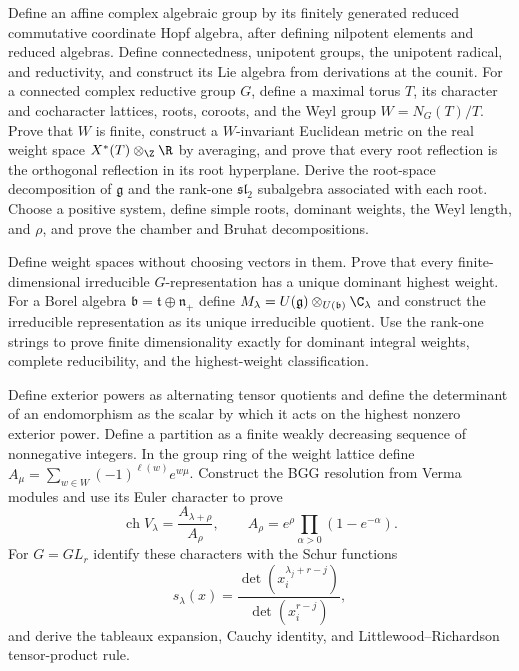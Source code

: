 \begin{exercise}
Define an affine complex algebraic group by its finitely generated reduced
commutative coordinate Hopf algebra, after defining nilpotent elements and
reduced algebras.  Define connectedness, unipotent groups,
the unipotent radical, and reductivity, and construct its Lie algebra from
derivations at the counit.  For a connected complex reductive group $G$,
define a maximal torus $T$, its
character and cocharacter lattices, roots, coroots, and the Weyl group
$W=N_G(T)/T$.  Prove that $W$ is finite, construct a $W$-invariant Euclidean
metric on the real weight space $X^*(T)\otimes_\Z\R$ by averaging, and prove
that every root reflection is the orthogonal reflection in its root
hyperplane.  Derive the root-space decomposition of $\mathfrak g$ and the
rank-one $\mathfrak{sl}_2$ subalgebra associated with each root.  Choose a
positive system, define simple roots, dominant weights, the Weyl length, and
$\rho$, and prove the chamber and Bruhat decompositions.
\end{exercise}

\begin{exercise}
Define weight spaces without choosing vectors in them.  Prove that every
finite-dimensional irreducible $G$-representation has a unique dominant
highest weight.  For a Borel algebra
$\mathfrak b=\mathfrak t\oplus\mathfrak n_+$ define
$M_\lambda=U(\mathfrak g)\otimes_{U(\mathfrak b)}\C_\lambda$ and construct
the irreducible representation as its unique irreducible quotient.  Use the
rank-one strings to prove finite
dimensionality exactly for dominant integral weights, complete reducibility,
and the highest-weight classification.
\end{exercise}

\begin{exercise}
Define exterior powers as alternating tensor quotients and define the
determinant of an endomorphism as the scalar by which it acts on the highest
nonzero exterior power.  Define a partition as a finite weakly decreasing
sequence of nonnegative integers.  In the group ring of the weight lattice
define
$A_\mu=\sum_{w\in W}(-1)^{\ell(w)}e^{w\mu}$.  Construct the BGG resolution
from Verma modules and use its Euler character to prove
\[
 \operatorname{ch}V_\lambda=\frac{A_{\lambda+\rho}}{A_\rho},
 \qquad
 A_\rho=e^\rho\prod_{\alpha>0}(1-e^{-\alpha}).
\]
For $G=GL_r$ identify these characters with the Schur functions
\[
 s_\lambda(x)=
\frac{\det(x_i^{\lambda_j+r-j})}{\det(x_i^{r-j})},
\]
and derive the tableaux expansion, Cauchy identity, and
Littlewood--Richardson tensor-product rule.
\end{exercise}

